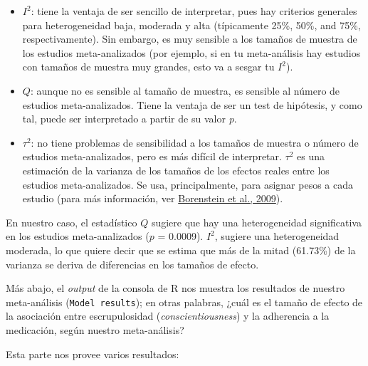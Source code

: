 \documentclass[
  bookmarksnumbered]{article}
\begin{document}
\begin{itemize}
\item
  \(I^2\): tiene la ventaja de ser sencillo de interpretar, pues hay criterios generales para heterogeneidad baja, moderada y alta (típicamente 25\%, 50\%, and 75\%, respectivamente). Sin embargo, es muy sensible a los tamaños de muestra de los estudios meta-analizados (por ejemplo, si en tu meta-análisis hay estudios con tamaños de muestra muy grandes, esto va a sesgar tu \(I^2\)).
\item
  \(Q\): aunque no es sensible al tamaño de muestra, es sensible al número de estudios meta-analizados. Tiene la ventaja de ser un test de hipótesis, y como tal, puede ser interpretado a partir de su valor \emph{p}.
\item
  \(\tau^2\): no tiene problemas de sensibilidad a los tamaños de muestra o número de estudios meta-analizados, pero es más difícil de interpretar. \(\tau^2\) es una estimación de la varianza de los tamaños de los efectos reales entre los estudios meta-analizados. Se usa, principalmente, para asignar pesos a cada estudio (para más información, ver \protect\hyperlink{ref-borensteinIdentifyingQuantifyingHeterogeneity2009}{Borenstein et al., 2009}).
\end{itemize}

En nuestro caso, el estadístico \(Q\) sugiere que hay una heterogeneidad significativa en los estudios meta-analizados (\(p\) = 0.0009). \(I^2\), sugiere una heterogeneidad moderada, lo que quiere decir que se estima que más de la mitad (61.73\%) de la varianza se deriva de diferencias en los tamaños de efecto.

Más abajo, el \emph{output} de la consola de R nos muestra los resultados de nuestro meta-análisis (\texttt{Model\ results}); en otras palabras, ¿cuál es el tamaño de efecto de la asociación entre escrupulosidad (\emph{conscientiousness}) y la adherencia a la medicación, según nuestro meta-análisis?

Esta parte nos provee varios resultados:
\end{document}
